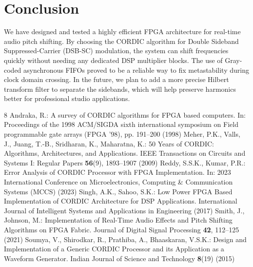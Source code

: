 \documentclass[runningheads]{llncs}
\begin{document}
\section{Conclusion}
We have designed and tested a highly efficient FPGA architecture for real-time audio pitch shifting. By choosing the CORDIC algorithm for Double Sideband Suppressed-Carrier (DSB-SC) modulation, the system can shift frequencies quickly without needing any dedicated DSP multiplier blocks. The use of Gray-coded asynchronous FIFOs proved to be a reliable way to fix metastability during clock domain crossing. In the future, we plan to add a more precise Hilbert transform filter to separate the sidebands, which will help preserve harmonics better for professional studio applications.
\begin{thebibliography}{8}
Andraka, R.: A survey of CORDIC algorithms for FPGA based computers. In: Proceedings of the 1998 ACM/SIGDA sixth international symposium on Field programmable gate arrays (FPGA '98), pp. 191--200 (1998)
Meher, P.K., Valls, J., Juang, T.-B., Sridharan, K., Maharatna, K.: 50 Years of CORDIC: Algorithms, Architectures, and Applications. IEEE Transactions on Circuits and Systems I: Regular Papers \textbf{56}(9), 1893--1907 (2009)
Reddy, S.S.K., Kumar, P.R.: Error Analysis of CORDIC Processor with FPGA Implementation. In: 2023 International Conference on Microelectronics, Computing \& Communication Systems (MCCS) (2023)
Singh, A.K., Sahoo, S.K.: Low Power FPGA Based Implementation of CORDIC Architecture for DSP Applications. International Journal of Intelligent Systems and Applications in Engineering (2017)
Smith, J., Johnson, M.: Implementation of Real-Time Audio Effects and Pitch Shifting Algorithms on FPGA Fabric. Journal of Digital Signal Processing \textbf{42}, 112--125 (2021)
Soumya, V., Shirodkar, R., Prathiba, A., Bhaaskaran, V.S.K.: Design and Implementation of a Generic CORDIC Processor and its Application as a Waveform Generator. Indian Journal of Science and Technology \textbf{8}(19) (2015)
\end{thebibliography}
\end{document}
